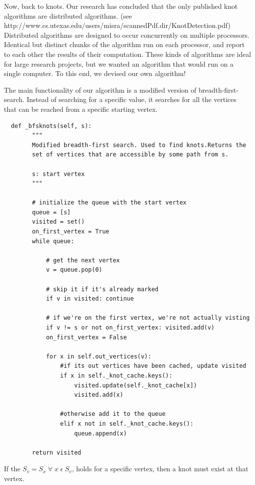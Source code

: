 \documentclass[10pt]{book}
\begin{document}
Now, back to knots. Our research has concluded that the only published knot algorithms are distributed algorithms. (see http://www.cs.utexas.edu/users/misra/scannedPdf.dir/KnotDetection.pdf) Distributed algorithms are designed to occur concurrently on multiple processors. Identical but distinct chunks of the algorithm run on each processor, and report to each other the results of their computation. These kinds of algorithms are ideal for large research projects, but we wanted an algorithm that would run on a single computer. To this end, we devised our own algorithm!

The main functionality of our algorithm is a modified version of breadth-first-search. Instead of searching for a specific value, it searches for all the vertices that can be reached from a specific starting vertex.  

\begin{verbatim}
  def _bfsknots(self, s):
        """
        Modified breadth-first search. Used to find knots.Returns the 
        set of vertices that are accessible by some path from s.

        s: start vertex
        """

        # initialize the queue with the start vertex
        queue = [s]
        visited = set()
        on_first_vertex = True
        while queue:

            # get the next vertex
            v = queue.pop(0)

            # skip it if it's already marked
            if v in visited: continue

            # if we're on the first vertex, we're not actually visting
            if v != s or not on_first_vertex: visited.add(v)
            on_first_vertex = False
            
            for x in self.out_vertices(v):
                #if its out vertices have been cached, update visited
                if x in self._knot_cache.keys():
                    visited.update(self._knot_cache[x])
                    visited.add(x)
                    
                #otherwise add it to the queue
                elif x not in self._knot_cache.keys():
                    queue.append(x)

        return visited
\end{verbatim}

If the $S_v = S_x \; \forall \; x \; \epsilon \; S_v$, holds for a specific vertex, then a knot must exist at that vertex.
\end{document}
